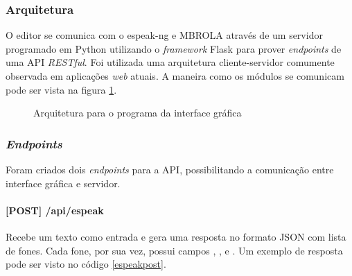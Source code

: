 \subsubsection{Arquitetura}
 O editor se comunica com o espeak-ng e MBROLA através de um
servidor programado em Python utilizando o \emph{framework} Flask para prover
\emph{endpoints} de uma API \emph{RESTful}. Foi utilizada uma arquitetura cliente-servidor \cite{rest} comumente observada em aplicações \emph{web} atuais. A maneira como os módulos se comunicam pode ser vista na figura \ref{fig:arch}.

\begin{figure}[!htbp]
\centering
{}
\caption{Arquitetura para o programa da interface gráfica}
\label{fig:arch}
\end{figure}

\subsubsection{\emph{Endpoints}}
Foram criados dois \emph{endpoints} para a API, possibilitando a comunicação entre
interface gráfica e servidor.

\paragraph{[POST] /api/espeak} Recebe um texto como entrada e gera uma resposta
no formato JSON com lista de fones. Cada fone, por sua vez, possui campos ,
,  e . Um exemplo de resposta pode ser visto no código \ref{espeakpost}.
